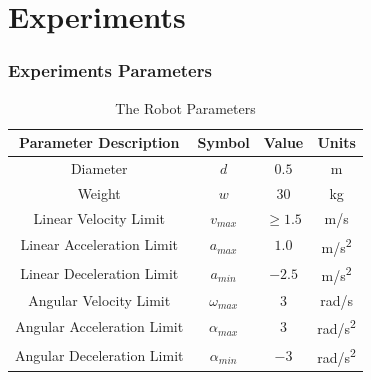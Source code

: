 \section{Experiments}

	\begin{frame}
		\frametitle{Experiments Parameters}
		\begin{table}[H]
			\centering
			\begin{tabular}{|c|c|c|c|}
				\hline
				\rowcolor{tugreen}
				Parameter Description & Symbol & Value & Units\\
				\hline
				\rowcolor{tugreen!20}
				Diameter 							 & $d$ 					  & $0.5$ & \si[per-mode=symbol]{\meter}\\
				\rowcolor{tugreen!20}
				Weight 								 & $w$ 					  & $30$ &  \si[per-mode=symbol]{\kilogram}\\
				\rowcolor{tugreen!20}
				Linear Velocity Limit 			& $v_{max}$ 		  & $\ge 1.5$ &  \si[per-mode=symbol]{\meter \per \second}\\ 
				\rowcolor{tugreen!20}
				Linear Acceleration Limit    & $a_{max}$  		   & $1.0$ & \si[per-mode=symbol]{\meter \per \second \squared}\\
				\rowcolor{tugreen!20}
				Linear Deceleration Limit    & $a_{min}$  		   & $-2.5$ & \si[per-mode=symbol]{\meter \per \second \squared}\\
				\rowcolor{tugreen!20}
				Angular Velocity Limit 		  &$\omega_{max}$ & $3$ & \si[per-mode=symbol]{\radian \per \second}\\
				\rowcolor{tugreen!20}
				Angular Acceleration Limit & $\alpha_{max}$  & $3$ & \si[per-mode=symbol]{\radian \per \second \squared}\\
				\rowcolor{tugreen!20}
				Angular Deceleration Limit & $\alpha_{min}$  & $-3$ & \si[per-mode=symbol]{\radian \per \second \squared} \\
				\hline
			\end{tabular}
			\caption{The Robot Parameters}
		\end{table}
 	\end{frame}
 
